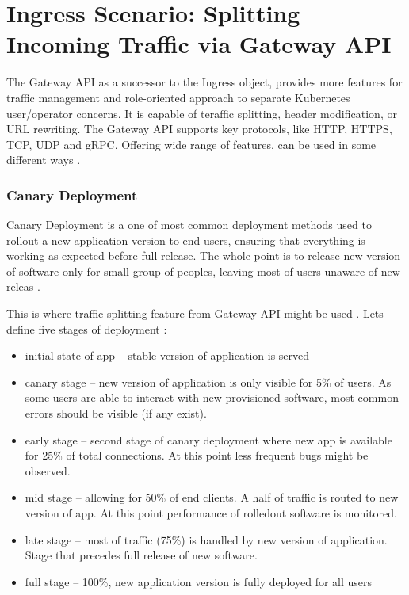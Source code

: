 \section{Ingress Scenario: Splitting Incoming Traffic via Gateway API}
\label{sec:ingress}

The Gateway API as a successor to the Ingress object, provides more features for traffic management and role-oriented approach to separate Kubernetes user/operator concerns. It is capable of teraffic splitting, header modification, or URL rewriting. The Gateway API supports key protocols, like HTTP, HTTPS, TCP, UDP and gRPC. Offering wide range of features, can be used in some different ways \cite{CiliumGatewayAPIBlog}.

\subsubsection{Canary Deployment}
\label{subsubsection:canary}

Canary Deployment is a one of most common deployment methods used to rollout a new application version to end users, ensuring that everything is working as expected before full release. The whole point is to release new version of software only for small group of peoples, leaving most of users unaware of new releas \cite{Canary}.

This is where traffic splitting feature from Gateway API might be used \cite{CiliumTrafficSplitting}. Lets define five stages of deployment \cite{Canary}:

\begin{itemize}
    \item initial state of app -- stable version of application is served
    \item canary stage -- new version of application is only visible for 5\% of users. As some users are able to interact with new provisioned software, most common errors should be visible (if any exist).
    \item early stage -- second stage of canary deployment where new app is available for 25\% of total connections. At this point less frequent bugs might be observed.
    \item mid stage -- allowing for 50\% of end clients. A half of traffic is routed to new version of app. At this point performance of rolledout software is monitored.
    \item late stage -- most of traffic (75\%) is handled by new version of application. Stage that precedes full release of new software.
    \item full stage -- 100\%, new application version is fully deployed for all users
\end{itemize}

